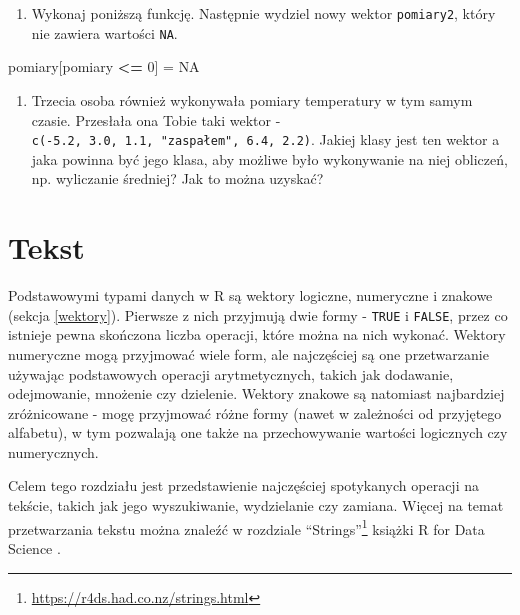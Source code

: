 \documentclass[paper=6in:9in,pagesize=pdftex,headinclude=on,footinclude=on,10pt]{scrbook}
\newenvironment{Shaded}{\begin{snugshade}}{\end{snugshade}}
\newcommand{\DecValTok}[1]{\textcolor[rgb]{0.00,0.00,0.81}{#1}}
\newcommand{\NormalTok}[1]{#1}
\newcommand{\OperatorTok}[1]{\textcolor[rgb]{0.81,0.36,0.00}{\textbf{#1}}}
\newcommand{\OtherTok}[1]{\textcolor[rgb]{0.56,0.35,0.01}{#1}}
\newcommand{\StringTok}[1]{\textcolor[rgb]{0.31,0.60,0.02}{#1}}
\DeclareRobustCommand{\href}[2]{#2\footnote{\url{#1}}}
\providecommand{\tightlist}{%
  \setlength{\itemsep}{0pt}\setlength{\parskip}{0pt}}
\begin{document}
\begin{enumerate}
\def\labelenumi{\arabic{enumi})}
\setcounter{enumi}{15}
\tightlist
\item
  Wykonaj poniższą funkcję.
  Następnie wydziel nowy wektor \texttt{pomiary2}, który nie zawiera wartości \texttt{NA}.
\end{enumerate}

\begin{Shaded}
\begin{Highlighting}[]
\NormalTok{pomiary[pomiary }\OperatorTok{<=}\StringTok{ }\DecValTok{0}\NormalTok{] =}\StringTok{ }\OtherTok{NA}
\end{Highlighting}
\end{Shaded}

\begin{enumerate}
\def\labelenumi{\arabic{enumi})}
\setcounter{enumi}{16}
\tightlist
\item
  Trzecia osoba również wykonywała pomiary temperatury w tym samym czasie.
  Przesłała ona Tobie taki wektor - \texttt{c(-5.2,\ 3.0,\ 1.1,\ "zaspałem",\ 6.4,\ 2.2)}.
  Jakiej klasy jest ten wektor a jaka powinna być jego klasa, aby możliwe było wykonywanie na niej obliczeń, np. wyliczanie średniej?
  Jak to można uzyskać?
\end{enumerate}

\hypertarget{tekst}{%
\chapter{Tekst}\label{tekst}}

Podstawowymi typami danych w R są wektory logiczne, numeryczne i znakowe (sekcja \ref{wektory}).
Pierwsze z nich przyjmują dwie formy - \texttt{TRUE} i \texttt{FALSE}, przez co istnieje pewna skończona liczba operacji, które można na nich wykonać.
Wektory numeryczne mogą przyjmować wiele form, ale najczęściej są one przetwarzanie używając podstawowych operacji arytmetycznych, takich jak dodawanie, odejmowanie, mnożenie czy dzielenie.
Wektory znakowe są natomiast najbardziej zróżnicowane - mogę przyjmować różne formy (nawet w zależności od przyjętego alfabetu), w tym pozwalają one także na przechowywanie wartości logicznych czy numerycznych.

Celem tego rozdziału jest przedstawienie najczęściej spotykanych operacji na tekście, takich jak jego wyszukiwanie, wydzielanie czy zamiana.
Więcej na temat przetwarzania tekstu można znaleźć w rozdziale \href{https://r4ds.had.co.nz/strings.html}{``Strings''} książki R for Data Science \citep{wickham2016r}.
\end{document}
